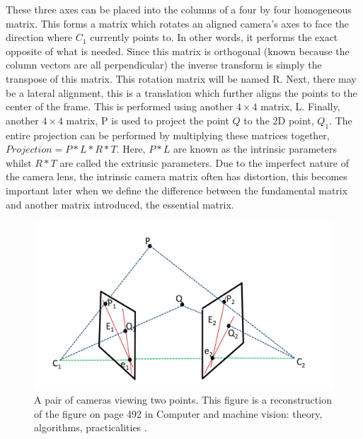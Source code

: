 These three axes can be placed into the columns of a four by four homogeneous matrix. This forms a matrix which rotates an aligned camera's axes to face the direction where $C_1$ currently points to. In other words, it performs the exact opposite of what is needed. Since this matrix is orthogonal (known because the column vectors are all perpendicular) the inverse transform is simply the transpose of this matrix. This rotation matrix will be named R. Next, there may be a lateral alignment, this is a translation which further aligns the points to the center of the frame. This is performed using another $4 \times 4$ matrix, L. Finally, another $4 \times 4$ matrix, P is used to project the point $Q$ to the 2D point, $Q_1$. The entire projection can be performed by multiplying these matrices together, $Projection = P * L * R * T$. Here, $P * L$ are known as the intrinsic parameters whilst $R * T$ are called the extrinsic parameters. Due to the imperfect nature of the camera lens, the intrinsic camera matrix often has distortion, this becomes important later when we define the difference between the fundamental matrix and another matrix introduced, the essential matrix.

\begin{figure}[t!]
	\includegraphics[width=5.0in]{images/introfm1}
	\caption{A pair of cameras viewing two points. This figure is a reconstruction of the figure on page 492 in Computer and machine vision: theory, algorithms, practicalities \cite{Davies12Computer}.}
	\label{fig:INTRO_FMA1}
\end{figure}  

